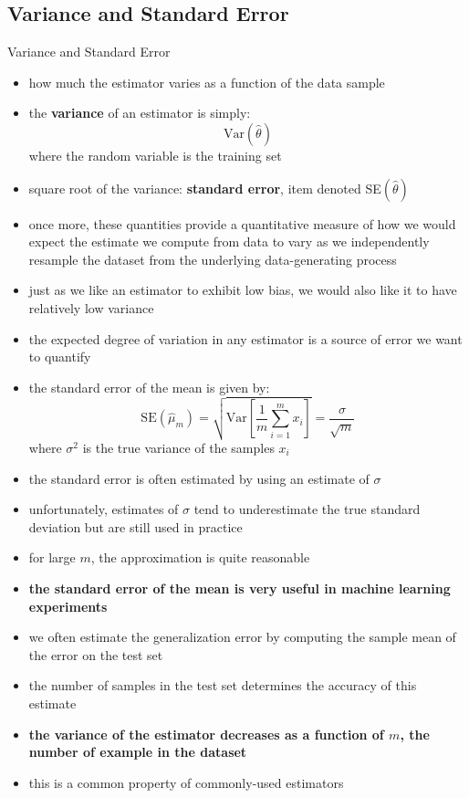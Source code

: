 \documentclass[11pt, twocolumn]{report}
\def\Var{\mathrm{Var}}
\begin{document}
\subsection{Variance and Standard Error}
Variance and Standard Error
\begin{itemize}
  \item how much the estimator varies as a function of the data sample
  \item the \textbf{variance} of an estimator is simply:
    \begin{equation}
      \Var(\hat{\theta})
    \end{equation}
    where the random variable is the training set
  \item square root of the variance: \textbf{standard error}, item denoted
    SE$(\hat{\theta})$
  \item once more, these quantities provide a quantitative measure of how we
    would expect the estimate we compute from data to vary as we independently
    resample the dataset from the underlying data-generating process
  \item just as we like an estimator to exhibit low bias, we would also like it
    to have relatively low variance
  \item the expected degree of variation in any estimator is a source of error
    we want to quantify
  \item the standard error of the mean is given by:
    \begin{equation}
      \text{SE}(\hat{\mu}_m) = \sqrt{\Var\left[\frac{1}{m} \sum_{i=1}^m x_i
        \right]} = \frac{\sigma}{\sqrt{m}}
    \end{equation}
    where $\sigma^2$ is the true variance of the samples $x_i$
  \item the standard error is often estimated by using an estimate of $\sigma$
  \item unfortunately, estimates of $\sigma$ tend to underestimate the true
    standard deviation but are still used in practice
  \item for large $m$, the approximation is quite reasonable
  \item \textbf{the standard error of the mean is very useful in machine
      learning experiments}
  \item we often estimate the generalization error by computing the sample mean
    of the error on the test set
  \item the number of samples in the test set determines the accuracy of this
    estimate
  \item \textbf{the variance of the estimator decreases as a function of $m$,
      the number of example in the dataset}
  \item this is a common property of commonly-used estimators
\end{itemize}
\end{document}
